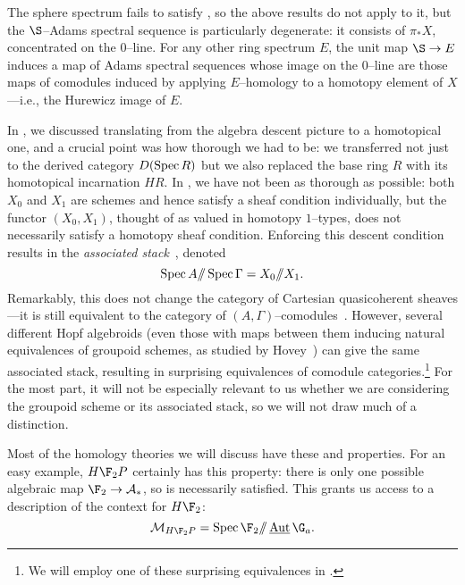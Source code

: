 \begin{remark}\label{HurewiczRemark}
The sphere spectrum fails to satisfy {\CH}, so the above results do not apply to it, but the $\S$--Adams spectral sequence is particularly degenerate: it consists of $\pi_* X$, concentrated on the $0$--line.  For any other ring spectrum $E$, the unit map $\S \to E$ induces a map of Adams spectral sequences whose image on the $0$--line are those maps of comodules induced by applying $E$--homology to a homotopy element of $X$---i.e., the Hurewicz image of $E$.
\end{remark}

\begin{remark}\label{WarningAboutStacks}
In , we discussed translating from the algebra descent picture to a homotopical one, and a crucial point was how thorough we had to be: we transferred not just to the derived category $D(\operatorname{Spec} R)$ but we also replaced the base ring $R$ with its homotopical incarnation $HR$.  In , we have not been as thorough as possible: both $X_0$ and $X_1$ are schemes and hence satisfy a sheaf condition individually, but the functor $(X_0, X_1)$, thought of as valued in homotopy $1$--types, does not necessarily satisfy a homotopy sheaf condition.  Enforcing this descent condition results in the \textit{associated stack}~\cite[Definition 8.13]{HopkinsCOCTALOS}, denoted \[\operatorname{Spec} A /\!\!/ \operatorname{Spec} \Gamma = X_0 /\!\!/ X_1.\]  Remarkably, this does not change the category of Cartesian quasicoherent sheaves---it is still equivalent to the category of $(A, \Gamma)$--comodules~\cite[Proposition 11.6]{HopkinsCOCTALOS}.  However, several different Hopf algebroids (even those with maps between them inducing natural equivalences of groupoid schemes, as studied by Hovey~\cite[Theorem D]{HoveyMoritaThy}) can give the same associated stack, resulting in surprising equivalences of comodule categories.\footnote{We will employ one of these surprising equivalences in .}  For the most part, it will not be especially relevant to us whether we are considering the groupoid scheme or its associated stack, so we will not draw much of a distinction.
\end{remark}

\begin{example}
Most of the homology theories we will discuss have these {\CH} and {\FH} properties.  For an easy example, $H\F_2P$ certainly has this property: there is only one possible algebraic map $\F_2 \to \mathcal A_*$, so {\FH} is necessarily satisfied.  This grants us access to a description of the context for $H\F_2$: \[\context{H\F_2P} = \Spec \F_2 \mmod \InternalAut{\G_a}.\]
\end{example}

